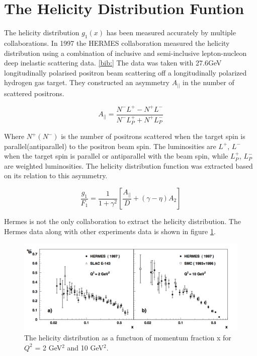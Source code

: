 \documentclass[abstract = on,listof=totoc, bibliography=totoc]{scrreprt}
\begin{document}
\section{The Helicity Distribution Funtion}

The helicity distribution $g_1(x)$ has been measured accurately by multiple collaborations. In 1997 the HERMES collaboration measured the helicity distribution using a combination of inclusive and semi-inclusive lepton-nucleon deep inelastic scattering data. \ref{bib:} The data was taken with 27.6GeV longitudinally polarised positron beam scattering off a longitudinally polarized hydrogen gas target. They constructed an asymmetry $A_{||}$ in the number of scattered positrons. 

\begin{equation}
A_{||} = \frac{N^-L^+ - N^+L^-}{N^-L_P^+ + N^+L_P^-} 
\end{equation}

Where $N^+(N^-)$ is the number of positrons scattered when the target spin is parallel(antiparallel) to the positron beam spin. The luminosities are $L^+$, $L^-$ when the target spin is parallel or antiparallel with the beam spin, while $L^+_P$, $L^-_P$ are weighted luminosities. The helicity distribution function was extracted based on its relation to this asymmetry.

\begin{equation}
\frac{g_1}{F_1} = \frac{1}{1+\gamma^2}\left[\frac{A_{||}}{D} + (\gamma - \eta)A_2\right]
\end{equation}

   
Hermes is not the only collaboration to extract the helicity distribution. The Hermes data along with other experiments data is shown in figure \ref{fig:helicityDist}. 


 \begin{figure}
\begin{center}
\includegraphics[width = 1\textwidth]{helicityDistFromHermes}
\caption[HERMES results for helicity distribution function]{The helicity distribution as a functuon of momentum fraction x for $Q^2$ = 2 GeV$^2$ and 10 GeV$^2$.}
\label{fig:helicityDist}
\end{center}
\end{figure}
\end{document}
